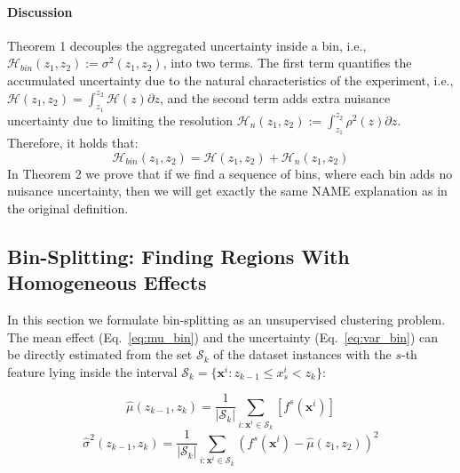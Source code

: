 \documentclass[twoside]{article}
\newcommand{\dfdx}{f^s}
\begin{document}
\paragraph{Discussion}

Theorem 1 decouples the aggregated uncertainty inside a bin, i.e.,
\(\mathcal{H}_{bin}(z_1, z_2) := \sigma^2(z_1, z_2)\), into two
terms. The first term quantifies the accumulated uncertainty due to
the natural characteristics of the experiment, i.e.,
\(\mathcal{H}(z_1, z_2) = \int_{z_1}^{z_2}\mathcal{H}(z) \partial z\),
and the second term adds extra nuisance uncertainty due to limiting
the resolution
\(\mathcal{H}_n(z_1, z_2) := \int_{z_1}^{z_2}\rho^2(z) \partial z
\). Therefore, it holds that:
\begin{equation}
  \label{eq:uncertainty_bin}
  \mathcal{H}_{bin}(z_1, z_2) = \mathcal{H}(z_1, z_2) + \mathcal{H}_n(z_1, z_2)
\end{equation}
%
In Theorem 2 we prove that if we find a sequence of bins, where each
bin adds no nuisance uncertainty, then we will get exactly the same
NAME explanation as in the original definition. 



\subsection{Bin-Splitting: Finding Regions With Homogeneous Effects}
\label{sec:interval-spliting}

In this section we formulate bin-splitting as an unsupervised
clustering problem. The mean effect (Eq.~\eqref{eq:mu_bin}) and the
uncertainty (Eq.~\eqref{eq:var_bin}) can be directly estimated from
the set \(\mathcal{S}_k\) of the dataset instances with the \(s\)-th
feature lying inside the interval
\( \mathcal{S}_k= \{ \mathbf{x}^i : z_{k-1} \leq x^i_s < z_k \}
\):

\begin{equation}
  \label{eq:2}
  \hat{\mu}(z_{k-1}, z_k) = \frac{1}{|\mathcal{S}_k|}
  \sum_{i:\mathbf{x}^i \in \mathcal{S}_k} \left [ \dfdx(\mathbf{x}^i)
  \right ]
\end{equation}
%
\begin{equation}
  \label{eq:3}
  \hat{\sigma}^2(z_{k-1}, z_k) = \frac{1}{|\mathcal{S}_k|}
\sum_{i:\mathbf{x}^i \in \mathcal{S}_k} \left ( \dfdx(\mathbf{x}^i) -
  \hat{\mu}(z_1, z_2) \right )^2
\end{equation}
\end{document}
